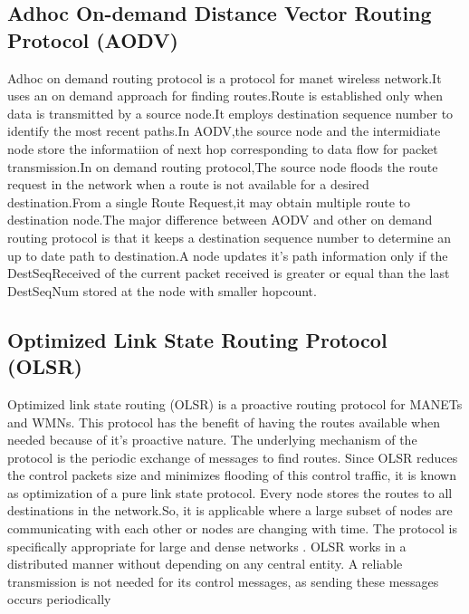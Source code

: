 \documentclass[12pt,a4paper]{report}
\begin{document}
\subsection{Adhoc On-demand Distance Vector Routing Protocol (AODV)}
Adhoc on demand routing protocol is a protocol for manet wireless network.It uses an on demand approach for finding routes.Route is established only when data is transmitted by a source node.It employs destination sequence number to identify the most recent paths.In AODV,the source node and the intermidiate node store the informatiion of next hop corresponding to data flow for packet transmission.In on demand routing protocol,The source node floods the route request in the network when a route is not available for a desired destination.From a single Route Request,it may obtain multiple route to  destination node.The major difference between AODV and other on demand routing protocol is that it keeps a destination sequence number to determine an up to date path to destination.A node updates it’s path information only if the DestSeqReceived of the current packet received is greater or equal than the  last DestSeqNum stored at the node with smaller hopcount.



\subsection{Optimized Link State Routing Protocol (OLSR)}
Optimized link state routing (OLSR) is a proactive routing protocol for MANETs and WMNs.
This protocol has the benefit of having the routes available when needed because
of it's proactive nature. The underlying mechanism of the protocol is the periodic
exchange of messages to find routes. Since OLSR reduces the control packets size
and minimizes flooding of this control traffic, it is known as optimization of a pure
link state protocol.  Every node stores the routes to all destinations
in the network.So, it is applicable where a large subset of nodes
are communicating with each other or nodes are changing with time. The protocol is
specifically appropriate for large and dense networks .
OLSR works in a distributed manner without depending on any central
entity. A reliable transmission is not needed for its control messages, as sending
these messages occurs periodically
\end{document}
